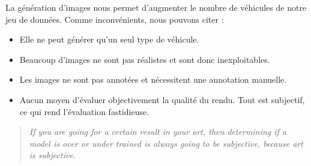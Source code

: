 La génération d'images nous permet d'augmenter le nombre de véhicules de notre jeu de données.
Comme inconvénients, nous pouvons citer :

\begin{itemize}
    \item Elle ne peut générer qu'un seul type de véhicule.
    \item Beaucoup d'images ne sont pas réalistes et sont donc inexploitables.
    \item Les images ne sont pas annotées et nécessitent une annotation manuelle.
    \item Aucun moyen d'évaluer objectivement la qualité du rendu. Tout est subjectif, ce qui rend l'évaluation fastidieuse.
\end{itemize}

\begin{quotation}
    \textit{If you are going for a certain result in your art, then determining if a model is over or under trained is always going to be subjective, because art is subjective.\cite{reddit_proverbe}}
\end{quotation}

